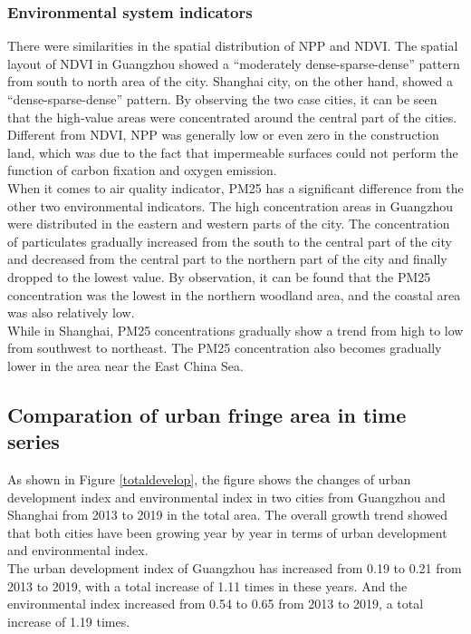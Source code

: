 \subsubsection{Environmental system indicators}
There were similarities in the spatial distribution of NPP and NDVI. The spatial layout of NDVI in Guangzhou showed a “moderately dense-sparse-dense” pattern from south to north area of the city. Shanghai city, on the other hand, showed a “dense-sparse-dense” pattern. By observing the two case cities, it can be seen that the high-value areas were concentrated around the central part of the cities. Different from NDVI, NPP was generally low or even zero in the construction land, which was due to the fact that impermeable surfaces could not perform the function of carbon fixation and oxygen emission.\\

When it comes to air quality indicator, PM25 has a significant difference from the other two environmental indicators. The high concentration areas in Guangzhou were distributed in the eastern and western parts of the city. The concentration of particulates gradually increased from the south to the central part of the city and decreased from the central part to the northern part of the city and finally dropped to the lowest value. By observation, it can be found that the PM25 concentration was the lowest in the northern woodland area, and the coastal area was also relatively low.\\

While in Shanghai, PM25 concentrations gradually show a trend from high to low from southwest to northeast. The PM25 concentration also becomes gradually lower in the area near the East China Sea.\\


\subsection{Comparation of urban fringe area in time series}
As shown in Figure \ref{totaldevelop}, the figure shows the changes of urban development index and environmental index in two cities from Guangzhou and Shanghai from 2013 to 2019 in the total area. The overall growth trend showed that both cities have been growing year by year in terms of urban development and environmental index.\\

The urban development index of Guangzhou has increased from 0.19 to 0.21 from 2013 to 2019, with a total increase of 1.11 times in these years. And the environmental index increased from 0.54 to 0.65 from 2013 to 2019, a total increase of 1.19 times.\\

